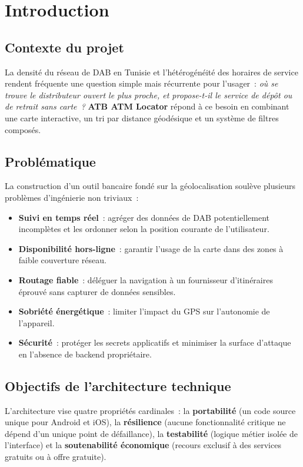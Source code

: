 \documentclass[11pt,a4paper]{article}
\begin{document}
\section{Introduction}
\subsection{Contexte du projet}
La densit\'e du r\'eseau de DAB en Tunisie et l'h\'et\'erog\'en\'eit\'e des
horaires de service rendent fr\'equente une question simple mais r\'ecurrente
pour l'usager~: \emph{o\`u se trouve le distributeur ouvert le plus proche, et
propose-t-il le service de d\'ep\^ot ou de retrait sans carte~?} \textbf{ATB ATM
Locator} r\'epond \`a ce besoin en combinant une carte interactive, un tri par
distance g\'eod\'esique et un syst\`eme de filtres compos\'es.

\subsection{Probl\'ematique}
La construction d'un outil bancaire fond\'e sur la g\'eolocalisation soul\`eve
plusieurs probl\`emes d'ing\'enierie non triviaux~:
\begin{itemize}[leftmargin=1.4em]
  \item \textbf{Suivi en temps r\'eel}~: agr\'eger des donn\'ees de DAB
  potentiellement incompl\`etes et les ordonner selon la position courante de
  l'utilisateur.
  \item \textbf{Disponibilit\'e hors-ligne}~: garantir l'usage de la carte dans
  des zones \`a faible couverture r\'eseau.
  \item \textbf{Routage fiable}~: d\'el\'eguer la navigation \`a un fournisseur
  d'itin\'eraires \'eprouv\'e sans capturer de donn\'ees sensibles.
  \item \textbf{Sobri\'et\'e \'energ\'etique}~: limiter l'impact du GPS sur
  l'autonomie de l'appareil.
  \item \textbf{S\'ecurit\'e}~: prot\'eger les secrets applicatifs et minimiser
  la surface d'attaque en l'absence de backend propri\'etaire.
\end{itemize}

\subsection{Objectifs de l'architecture technique}
L'architecture vise quatre propri\'et\'es cardinales~: la
\textbf{portabilit\'e} (un code source unique pour Android et iOS), la
\textbf{r\'esilience} (aucune fonctionnalit\'e critique ne d\'epend d'un unique
point de d\'efaillance), la \textbf{testabilit\'e} (logique m\'etier isol\'ee de
l'interface) et la \textbf{soutenabilit\'e \'economique} (recours exclusif \`a
des services gratuits ou \`a offre gratuite).
\end{document}
